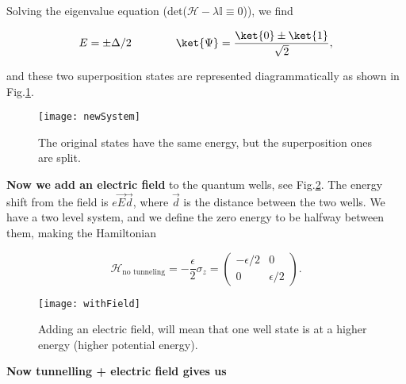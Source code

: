    \noindent        Solving        the       eigenvalue        equation
   (det($\mathcal{H}-\lambda\mathbb{I}\equiv0$)), we find

   \begin{equation}
     \label{l1-solutionFirst}
     E = \pm\Delta/2\qquad\qquad\ket{\Psi}=\frac{\ket{0}\pm\ket{1}}{\sqrt{2}},
   \end{equation}

   \noindent  and  these  two   superposition  states  are  represented
   diagrammatically as shown in Fig.\ref{fig:newSystem}.

   \begin{figure}[h]
     \begin{center}
       \texttt{[image: newSystem]}
       \caption{\small The  original states  have the same  energy, but
         the superposition ones are split. \label{fig:newSystem}}
     \end{center}
   \end{figure}

   \textbf{Now  we add  an electric  field} to  the quantum  wells, see
   Fig.\ref{fig:withField}.   The  energy  shift   from  the  field  is
   $e\vec{E}\vec{d}$, where  $\vec{d}$ is the distance  between the two
   wells. We have a two level system,  and we define the zero energy to
   be halfway between them, making the Hamiltonian

   \begin{equation}
     \label{l1-1}
     \mathcal{H}_{\text{no tunneling}} = -\frac{\epsilon}{2}\sigma_z = \left(\begin{matrix}
         -\epsilon/2 & 0\\ 0 & \epsilon/2
       \end{matrix}\right).
   \end{equation}

   \begin{figure}
     \begin{center}
       \texttt{[image: withField]}
       \caption{\small  Adding an  electric field,  will mean  that one
         well state is at a higher energy (higher potential energy).}
       \label{fig:withField}
     \end{center}
   \end{figure}

   \textbf{Now tunnelling + electric field gives us }

